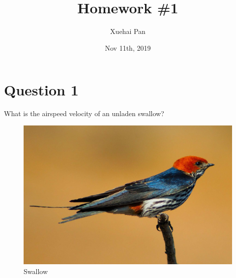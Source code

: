 \documentclass[
  UTF8, %
  12pt, %
]{assignment}
\title{Homework \#1} %
\author{Xuehai Pan} %
\date{Nov 11th, 2019} %
\institute{School of Electronics Engineering and Computer Science \\ Peking University} %
\begin{document}
\maketitle %


\section*{Question 1}

\begin{problem}
What is the airspeed velocity of an unladen swallow?
\end{problem}

\begin{figure}[H]
  \centering
  \includegraphics[width=0.5\columnwidth]{swallow.jpg} %
  \caption{Swallow}
  \label{fig:swallow}
\end{figure}
\end{document}
